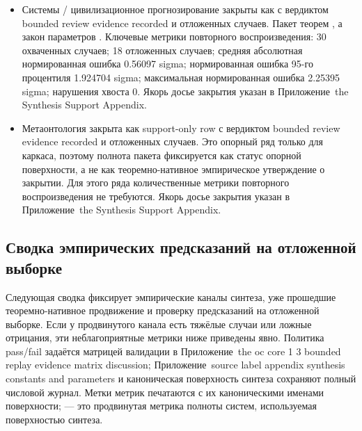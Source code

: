 \begin{itemize}[leftmargin=1.6em,nosep]
\item Системы / цивилизационное прогнозирование закрыты как  с вердиктом bounded review evidence recorded и  отложенных случаев. Пакет теорем , а закон параметров . Ключевые метрики повторного воспроизведения: 30 охваченных случаев; 18 отложенных случаев; средняя абсолютная нормированная ошибка 0.56097 sigma; нормированная ошибка 95-го процентиля 1.924704 sigma; максимальная нормированная ошибка 2.25395 sigma; нарушения хвоста 0. Якорь досье закрытия указан в Приложение~the Synthesis Support Appendix.
\item Метаонтология закрыта как support-only row с вердиктом bounded review evidence recorded и  отложенных случаев. Это опорный ряд только для каркаса, поэтому полнота пакета фиксируется как статус опорной поверхности, а не как теоремно-нативное эмпирическое утверждение о закрытии. Для этого ряда количественные метрики повторного воспроизведения не требуются. Якорь досье закрытия указан в Приложение~the Synthesis Support Appendix.
\end{itemize}

\subsection{Сводка эмпирических предсказаний на отложенной выборке}
Следующая сводка фиксирует эмпирические каналы синтеза, уже прошедшие теоремно-нативное продвижение и проверку предсказаний на отложенной выборке.
Если у продвинутого канала есть тяжёлые случаи или ложные отрицания, эти неблагоприятные метрики ниже приведены явно. Политика pass/fail задаётся матрицей валидации в Приложение~the oc core 1 3 bounded replay evidence matrix discussion; Приложение~source label appendix synthesis constants and parameters и каноническая поверхность синтеза сохраняют полный числовой журнал.
Метки метрик печатаются с их каноническими именами поверхности;  — это продвинутая метрика полноты систем, используемая поверхностью синтеза.

